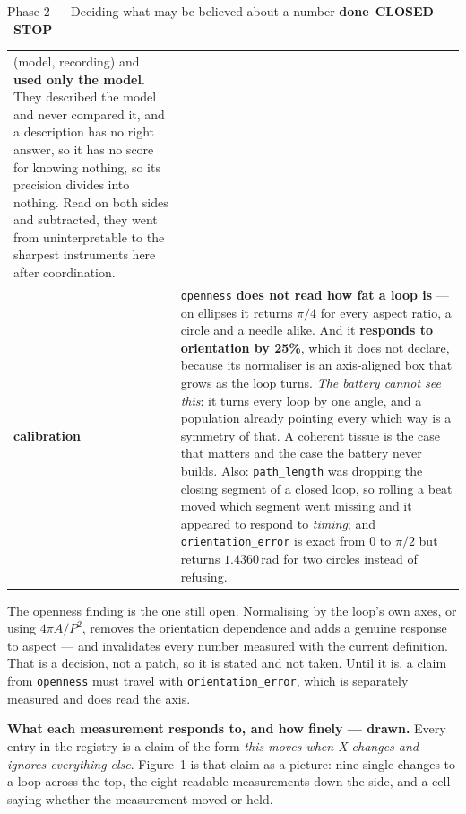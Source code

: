 \documentclass[11pt,a4paper]{article}
\newcommand{\code}[1]{\texttt{#1}}
\newcommand{\dn}{\textcolor{good}{\textbf{done}}}
\newcommand{\stopp}{\textcolor{bad!30!white}{\textbf{STOP}}}
\begin{document}
\begin{phasebox}{Phase 2 --- Deciding what may be believed about a number \hfill \dn\ \textbf{CLOSED} \ \stopp}
\begin{center}
\begin{tabular}{@{}l p{10.2cm}@{}}
(model, recording) and \textbf{used only the model}. They described the model and never compared it,
and a description has no right answer, so it has no score for knowing nothing, so its precision
divides into nothing. Read on both sides and subtracted, they went from uninterpretable to the
sharpest instruments here after coordination.\\
\addlinespace
\textbf{calibration} & \code{openness} \textbf{does not read how fat a loop is} --- on ellipses it
returns $\pi/4$ for every aspect ratio, a circle and a needle alike. And it \textbf{responds to
orientation by 25\%}, which it does not declare, because its normaliser is an axis-aligned box that
grows as the loop turns. \emph{The battery cannot see this}: it turns every loop by one angle, and a
population already pointing every which way is a symmetry of that. A coherent tissue is the case
that matters and the case the battery never builds. Also: \code{path\_length} was dropping the
closing segment of a closed loop, so rolling a beat moved which segment went missing and it appeared
to respond to \emph{timing}; and \code{orientation\_error} is exact from $0$ to $\pi/2$ but returns
$1.4360$\,rad for two circles instead of refusing.\\
\bottomrule
\end{tabular}
\end{center}

\noindent The openness finding is the one still open. Normalising by the loop's own axes, or using
$4\pi A/P^2$, removes the orientation dependence and adds a genuine response to aspect --- and
invalidates every number measured with the current definition. That is a decision, not a patch, so
it is stated and not taken. Until it is, a claim from \code{openness} must travel with
\code{orientation\_error}, which is separately measured and does read the axis.

\medskip
\noindent\textbf{What each measurement responds to, and how finely --- drawn.} Every entry in the
registry is a claim of the form \emph{this moves when X changes and ignores everything else}.
Figure~1 is that claim as a picture: nine single changes to a loop across the top, the eight readable
measurements down the side, and a cell saying whether the measurement moved or held.


\end{phasebox}
\end{document}
